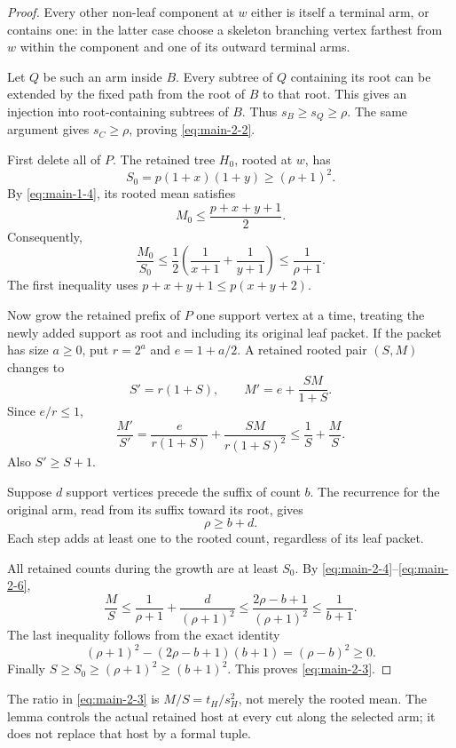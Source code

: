 \documentclass[11pt,letterpaper]{article}
\theoremstyle{plain}
\begin{document}
\begin{proof} Every other non-leaf component at \(w\) either is itself a terminal arm, or contains one: in the latter case choose a skeleton branching vertex farthest from \(w\) within the component and one of its outward terminal arms.

Let \(Q\) be such an arm inside \(B\). Every subtree of \(Q\) containing its root can be extended by the fixed path from the root of \(B\) to that root. This gives an injection into root-containing subtrees of \(B\). Thus \(s_B\ge s_Q\ge\rho\). The same argument gives \(s_C\ge\rho\), proving \eqref{eq:main-2-2}.

First delete all of \(P\). The retained tree \(H_0\), rooted at \(w\), has \[
S_0=p(1+x)(1+y)\ge(\rho+1)^2.
\] By \eqref{eq:main-1-4}, its rooted mean satisfies \[
M_0\le\frac{p+x+y+1}{2}.
\] Consequently, \[
\frac{M_0}{S_0}
\le\frac12\left(\frac1{x+1}+\frac1{y+1}\right)
\le\frac1{\rho+1}.
\tag{2.4}\label{eq:main-2-4}
\] The first inequality uses \(p+x+y+1\le p(x+y+2)\).

Now grow the retained prefix of \(P\) one support vertex at a time, treating the newly added support as root and including its original leaf packet. If the packet has size \(a\ge0\), put \(r=2^a\) and \(e=1+a/2\). A retained rooted pair \((S,M)\) changes to \[
S'=r(1+S),\qquad M'=e+\frac{SM}{1+S}.
\] Since \(e/r\le1\), \[
\frac{M'}{S'}
=\frac{e}{r(1+S)}+\frac{SM}{r(1+S)^2}
\le\frac1S+\frac MS.
\tag{2.5}\label{eq:main-2-5}
\] Also \(S'\ge S+1\).

Suppose \(d\) support vertices precede the suffix of count \(b\). The recurrence for the original arm, read from its suffix toward its root, gives \[
\rho\ge b+d.
\tag{2.6}\label{eq:main-2-6}
\] Each step adds at least one to the rooted count, regardless of its leaf packet.

All retained counts during the growth are at least \(S_0\). By \eqref{eq:main-2-4}--\eqref{eq:main-2-6}, \[
\frac MS
\le\frac1{\rho+1}+\frac d{(\rho+1)^2}
\le\frac{2\rho-b+1}{(\rho+1)^2}
\le\frac1{b+1}.
\] The last inequality follows from the exact identity \[
(\rho+1)^2-(2\rho-b+1)(b+1)=(\rho-b)^2\ge0.
\tag{2.7}\label{eq:main-2-7}
\] Finally \(S\ge S_0\ge(\rho+1)^2\ge(b+1)^2\). This proves \eqref{eq:main-2-3}. \end{proof}

The ratio in \eqref{eq:main-2-3} is \(M/S=t_H/s_H^2\), not merely the rooted mean. The lemma controls the actual retained host at every cut along the selected arm; it does not replace that host by a formal tuple.
\end{document}
